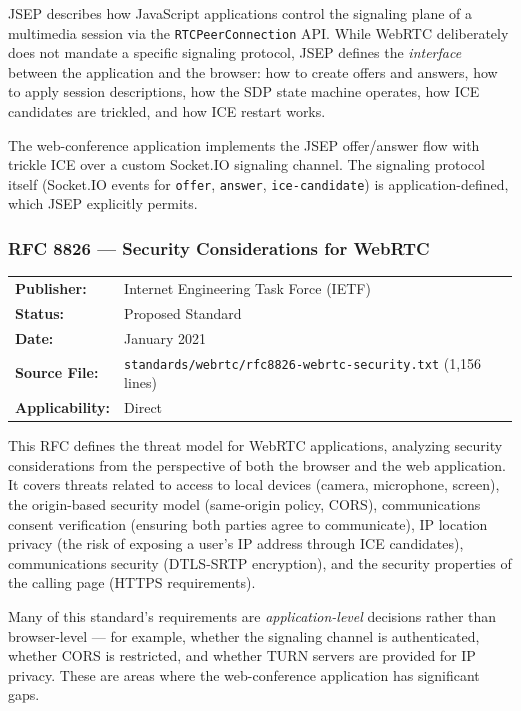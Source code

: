 \documentclass[11pt,letterpaper]{article}
\begin{document}
\vspace{0.5em}
JSEP describes how JavaScript applications control the signaling plane of a multimedia session via the \texttt{RTCPeerConnection} API. While WebRTC deliberately does not mandate a specific signaling protocol, JSEP defines the \textit{interface} between the application and the browser: how to create offers and answers, how to apply session descriptions, how the SDP state machine operates, how ICE candidates are trickled, and how ICE restart works.

The web-conference application implements the JSEP offer/answer flow with trickle ICE over a custom Socket.IO signaling channel. The signaling protocol itself (Socket.IO events for \texttt{offer}, \texttt{answer}, \texttt{ice-candidate}) is application-defined, which JSEP explicitly permits.

\subsubsection{RFC 8826 --- Security Considerations for WebRTC}
\label{app:rfc8826}

\begin{tabular}{ll}
\textbf{Publisher:} & Internet Engineering Task Force (IETF) \\
\textbf{Status:} & Proposed Standard \\
\textbf{Date:} & January 2021 \\
\textbf{Source File:} & \texttt{standards/webrtc/rfc8826-webrtc-security.txt} (1,156 lines) \\
\textbf{Applicability:} & Direct \\
\end{tabular}

\vspace{0.5em}
This RFC defines the threat model for WebRTC applications, analyzing security considerations from the perspective of both the browser and the web application. It covers threats related to access to local devices (camera, microphone, screen), the origin-based security model (same-origin policy, CORS), communications consent verification (ensuring both parties agree to communicate), IP location privacy (the risk of exposing a user's IP address through ICE candidates), communications security (DTLS-SRTP encryption), and the security properties of the calling page (HTTPS requirements).

Many of this standard's requirements are \textit{application-level} decisions rather than browser-level --- for example, whether the signaling channel is authenticated, whether CORS is restricted, and whether TURN servers are provided for IP privacy. These are areas where the web-conference application has significant gaps.
\end{document}
